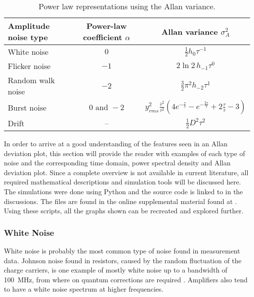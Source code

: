 \begin{table}[ht]
    \centering
    \begin{tabular}{lcc}
        \toprule
        Amplitude noise type& Power-law coefficient $\alpha$& Allan variance $\sigma_A^2$\\
        \midrule
            White noise & $0$& $\frac 1 2 h_0 \tau^{-1}$ \cite{adev_noise_types}\\
            Flicker noise& $-1$& $2 \ln 2 \, h_{-1} \tau^0$ \cite{adev_noise_types}\\
            Random walk noise& $-2$& $\frac 3 2 \pi^2 h_{-2} \tau^{1}$ \cite{adev_noise_types}\\
            Burst noise& $0 \textrm{ and } -\!2$& $y_{rms}^2\frac{\bar \tau^2}{\tau^2} \left(4 e^{-\frac{\tau}{\bar \tau}} - e^{-\frac{2 \tau}{\bar \tau}} + 2 \frac{\tau}{\bar \tau} - 3 \right)$\\
            Drift & --& $\frac 1 2 D^2 \tau^2$ \cite{adev_drift}\\
        \bottomrule
    \end{tabular}
    \caption{Power law representations using the Allan variance.}
    \label{tab:adev_alpha}
\end{table}

In order to arrive at a good understanding of the features seen in an Allan deviation plot, this section will provide the reader with examples of each type of noise and the corresponding time domain, power spectral density and Allan deviation plot. Since a complete overview is not available in current literature, all required mathematical descriptions and simulation tools will be discussed here. The simulations were done using Python and the source code is linked to in the discussions. The files are found in the online supplemental material found at \cite{supplemental_material}. Using these scripts, all the graphs shown can be recreated and explored further.

\clearpage
\subsubsection{White Noise}
White noise is probably the most common type of noise found in measurement data. Johnson noise found in resistors, caused by the random fluctuation of the charge carriers, is one example of mostly white noise up to a bandwidth of \qty{100}{\MHz}, from where on quantum corrections are required \cite{nist_johnson_noise}. Amplifiers also tend to have a white noise spectrum at higher frequencies.

